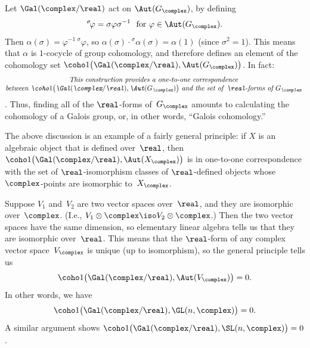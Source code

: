 Let $\Gal(\complex/\real)$ act on $\Aut ( G_{\complex} )$, by defining 
	$$ \text{${}^\sigma \! \varphi = \sigma \varphi \sigma^{-1}$ \ for $\varphi \in \Aut ( G_{\complex} )$} .$$
Then $\alpha(\sigma) = \varphi^{-1} \, {}^\sigma \!\varphi$, so 
$\alpha(\sigma) \cdot {}^\sigma \! \alpha(\sigma) = \alpha(1)$ (since $\sigma^2 = 1$). This means that $\alpha$ is $1$-cocycle of group cohomology, and therefore defines an element of the cohomology set $\coho1\bigl( \Gal(\complex/\real), \Aut ( G_{\complex} ) \bigr)$. 
In fact:
	\begin{align} \label{RFormsG=Coho}
	 \hbox{\em$\begin{matrix}
	\text{This construction provides a one-to-one correspondence}
	\\\text{between $\coho1\bigl( \Gal(\complex/\real), \Aut ( G_{\complex} ) \bigr)$ and the set of\/ $\real$-forms of~$G_{\complex}$} \end{matrix}$ } 
	\end{align}
.
Thus, finding all of the $\real$-forms of~$G_{\complex}$ amounts to calculating the cohomology of a Galois group, or, in other words, ``Galois cohomology\zz.'' 


\begin{obs} \label{H1=Rforms}
\normalfont The above discussion is an example of a fairly general principle: if $X$ is an algebraic object that is defined over~$\real$, then $\coho1\bigl( \Gal(\complex/\real), \Aut(X_\complex) \bigr)$ is in one-to-one correspondence with the set of $\real$-isomorphism classes of $\real$-defined objects whose $\complex$-points are isomorphic to~$X_\complex$.
\end{obs}

\begin{eg} \label{H1GL=0} \label{H1SL=0}
Suppose $V_1$ and~$V_2$ are two vector spaces over~$\real$, and they are isomorphic over~$\complex$.  (I.e., $V_1 \otimes \complex \iso V_2 \otimes \complex$.) Then the two vector spaces have the same dimension, so elementary linear algebra tells us that they are isomorphic over~$\real$. This means that the $\real$-form of any complex vector space~$V_\complex$ is unique (up to isomorphism), so the general principle  tells us
	$$\coho1\bigl( \Gal(\complex/\real), \Aut(V_\complex) \bigr) = 0 .$$
In other words, we have 
	$$\coho1\bigl( \Gal(\complex/\real), \GL(n,\complex) \bigr) = 0 .$$
A similar argument shows $\coho1\bigl( \Gal(\complex/\real),  \SL(n,\complex) \bigr) = 0$ .
\end{eg}

